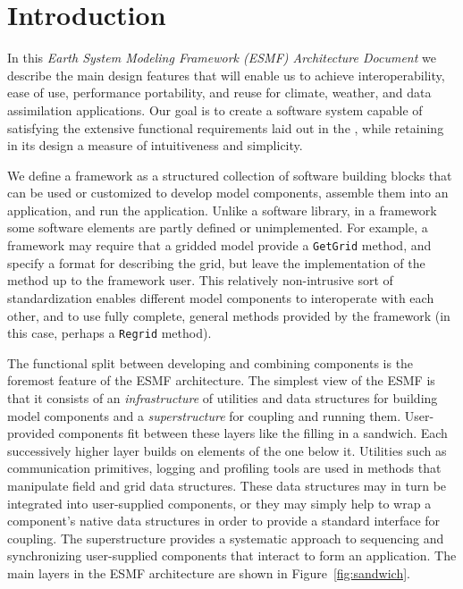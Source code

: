 \section{Introduction}
\label{sec:intro}

In this {\it Earth System Modeling Framework (ESMF) Architecture Document} we describe 
the main design features that will enable us to achieve interoperability, ease of 
use, performance portability, and reuse for climate, weather, and data assimilation
applications.  Our goal is to create a software system capable of satisfying
the extensive functional requirements laid out in the  \cite{bib:ESMFreqdoc}, 
while retaining in its design a measure of intuitiveness and simplicity. 

We define a framework as a structured collection of software building blocks 
that can be used or customized to develop model components, assemble them into an 
application, and run the application.  Unlike a software library, in a framework some
software elements are partly defined or unimplemented.  For example, a framework
may require that a gridded model provide a {\tt GetGrid} method, and specify 
a format for describing the grid, but leave the implementation of the method up
to the framework user.  This relatively non-intrusive sort of standardization enables 
different model components to interoperate with each other, and to use fully
complete, general methods provided by the framework (in this case, perhaps a 
{\tt Regrid} method).

The functional split between developing and combining components is the
foremost feature of the ESMF architecture.  The simplest view of the ESMF 
is that it consists of an {\it infrastructure} of utilities and data 
structures for building model components and a {\it superstructure} for coupling 
and running them.  User-provided components fit between these 
layers like the filling in a sandwich.  Each successively higher layer builds
on elements of the one below it.  Utilities such as communication
primitives, logging and profiling tools are used in methods that
manipulate field and grid data structures.  These data structures may in 
turn be integrated into user-supplied components, or they may simply 
help to wrap a component's native data structures in order to provide 
a standard interface for coupling.  The superstructure provides a systematic 
approach to sequencing and synchronizing user-supplied components that 
interact to form an application.  The main layers in the ESMF architecture are 
shown in Figure~\ref{fig:sandwich}.  

